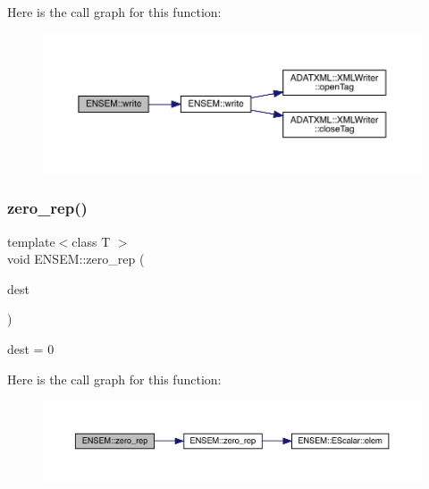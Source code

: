 Here is the call graph for this function\+:\nopagebreak
\begin{figure}[H]
\begin{center}
\leavevmode
\includegraphics[width=350pt]{d1/d71/group__obsscalar_ga921d40c8afba8e09044b5c679c71b495_cgraph}
\end{center}
\end{figure}
\mbox{\label{group__obsscalar_ga752f81e54e6f8f8362126b8d0668b340}} 
\subsubsection{\texorpdfstring{zero\_rep()}{zero\_rep()}}
{\footnotesize\ttfamily template$<$class T $>$ \\
void E\+N\+S\+E\+M\+::zero\+\_\+rep (\begin{DoxyParamCaption}\item[{\mbox{\hyperlink{classENSEM_1_1OScalar}{O\+Scalar}}$<$ T $>$ \&}]{dest }\end{DoxyParamCaption})\hspace{0.3cm}{\ttfamily [inline]}}



dest = 0 

Here is the call graph for this function\+:\nopagebreak
\begin{figure}[H]
\begin{center}
\leavevmode
\includegraphics[width=350pt]{d1/d71/group__obsscalar_ga752f81e54e6f8f8362126b8d0668b340_cgraph}
\end{center}
\end{figure}
